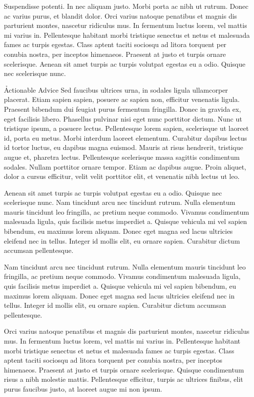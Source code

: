 \documentclass[onecolumn]{tome}
\begin{document}
Suspendisse potenti. In nec aliquam justo. Morbi porta ac nibh ut rutrum. Donec ac varius purus, et blandit dolor. Orci varius natoque penatibus et magnis dis parturient montes, nascetur ridiculus mus. In fermentum luctus lorem, vel mattis mi varius in. Pellentesque habitant morbi tristique senectus et netus et malesuada fames ac turpis egestas. Class aptent taciti sociosqu ad litora torquent per conubia nostra, per inceptos himenaeos. Praesent at justo et turpis ornare scelerisque. Aenean sit amet turpis ac turpis volutpat egestas eu a odio. Quisque nec scelerisque nunc.

\h{Actionable Advice}
Sed faucibus ultrices urna, in sodales ligula ullamcorper placerat. Etiam sapien sapien, posuere ac sapien non, efficitur venenatis ligula. Praesent bibendum dui feugiat purus fermentum fringilla. Donec in gravida ex, eget facilisis libero. Phasellus pulvinar nisi eget nunc porttitor dictum. Nunc ut tristique ipsum, a posuere lectus. Pellentesque lorem sapien, scelerisque ut laoreet id, porta eu metus. Morbi interdum laoreet elementum. Curabitur dapibus lectus id tortor luctus, eu dapibus magna euismod. Mauris at risus hendrerit, tristique augue et, pharetra lectus. Pellentesque scelerisque massa sagittis condimentum sodales. Nullam porttitor ornare tempor. Etiam ac dapibus augue. Proin aliquet, dolor a cursus efficitur, velit velit porttitor elit, et venenatis nibh lectus ut leo.

Aenean sit amet turpis ac turpis volutpat egestas eu a odio. Quisque nec scelerisque nunc. Nam tincidunt arcu nec tincidunt rutrum. Nulla elementum mauris tincidunt leo fringilla, ac pretium neque commodo. Vivamus condimentum malesuada ligula, quis facilisis metus imperdiet a. Quisque vehicula mi vel sapien bibendum, eu maximus lorem aliquam. Donec eget magna sed lacus ultricies eleifend nec in tellus. Integer id mollis elit, eu ornare sapien. Curabitur dictum accumsan pellentesque.

Nam tincidunt arcu nec tincidunt rutrum. Nulla elementum mauris tincidunt leo fringilla, ac pretium neque commodo. Vivamus condimentum malesuada ligula, quis facilisis metus imperdiet a. Quisque vehicula mi vel sapien bibendum, eu maximus lorem aliquam. Donec eget magna sed lacus ultricies eleifend nec in tellus. Integer id mollis elit, eu ornare sapien. Curabitur dictum accumsan pellentesque.

Orci varius natoque penatibus et magnis dis parturient montes, nascetur ridiculus mus. In fermentum luctus lorem, vel mattis mi varius in. Pellentesque habitant morbi tristique senectus et netus et malesuada fames ac turpis egestas. Class aptent taciti sociosqu ad litora torquent per conubia nostra, per inceptos himenaeos. Praesent at justo et turpis ornare scelerisque. Quisque condimentum risus a nibh molestie mattis. Pellentesque efficitur, turpis ac ultrices finibus, elit purus faucibus justo, at laoreet augue mi non ipsum.
\end{document}
